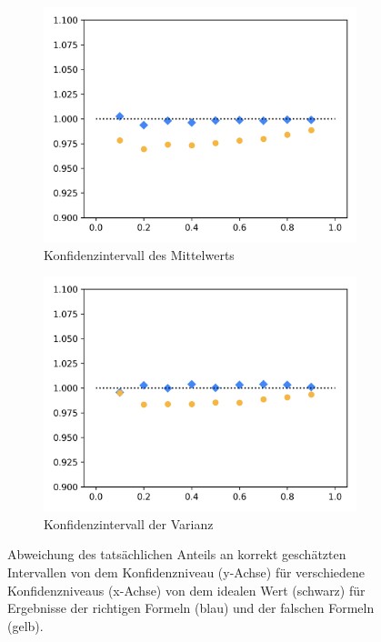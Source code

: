 \documentclass[10pt,twocolumn]{scrartcl}
\begin{document}
		\begin{figure}[h]%
			\centering
			\begin{subfigure}[c]{1\columnwidth}
				\includegraphics[width=0.9\columnwidth]{images/mean_interval.png}
				\caption{Konfidenzintervall des Mittelwerts}
				\label{fig_mean_interval_dot}
			\end{subfigure}
			\begin{subfigure}[c]{1\columnwidth}
				\includegraphics[width=0.9\columnwidth]{images/var_interval.png}
				\caption{Konfidenzintervall der Varianz}
				\label{fig_var_interval_dot}
			\end{subfigure}
			\caption{Abweichung des tatsächlichen Anteils an korrekt geschätzten Intervallen von dem Konfidenzniveau (y-Achse) für verschiedene Konfidenzniveaus (x-Achse) von dem idealen Wert (schwarz) für Ergebnisse der richtigen Formeln (blau) und der falschen Formeln (gelb).}
		\end{figure}
\end{document}
